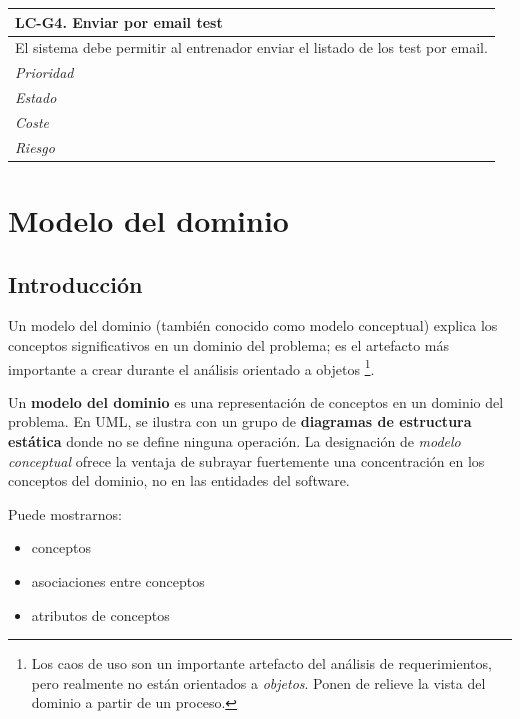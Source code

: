 	\begin{center}
		\begin{tabularx}{15cm}{|X|}
			\hline 
				\bf{LC-G4. Enviar por email test}\\
			\hline
				El sistema debe permitir al entrenador enviar el listado de los test por email.\\
			\hline
				\it{Prioridad}\\
			\hline
				\it{Estado}\\
			\hline
				\it{Coste}\\
			\hline
				\it{Riesgo}\\
			\hline
		\end{tabularx}
	\end{center}
	\bigskip %

%
%
\section{Modelo del dominio} %
	\label{sec:modelo_del_dominio}

%
%
\subsection{Introducción} %
	\label{sub:md_introduccion}
	
	Un modelo del dominio (también conocido como modelo conceptual) explica los conceptos significativos en un dominio del problema; es el artefacto más importante a crear durante el análisis orientado a objetos \footnote{Los caos de uso son un importante artefacto del análisis de requerimientos, pero realmente no están orientados a {\it objetos}. Ponen de relieve la vista del dominio a partir de un proceso.}. 
	
	Un {\bf modelo del dominio} es una representación de conceptos en un dominio del problema\cite{Fowler96}\cite{MO95}. En UML, se ilustra con un grupo de {\bf diagramas de estructura estática} donde no se define ninguna operación. La designación de {\it modelo conceptual} ofrece la ventaja de subrayar fuertemente una concentración en los conceptos del dominio, no en las entidades del software.
	
	Puede mostrarnos:
	\begin{itemize}
		\item{conceptos}
		\item{asociaciones entre conceptos}
		\item{atributos de conceptos}
	\end{itemize}
	
